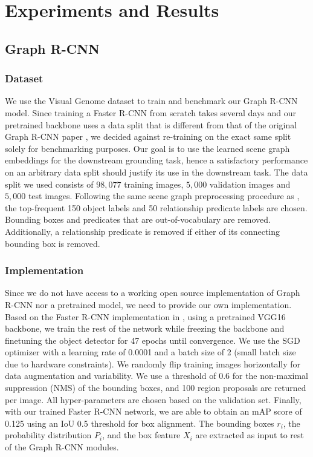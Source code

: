 \section{Experiments and Results}
\subsection{Graph R-CNN}
\subsubsection{Dataset}
We use the Visual Genome dataset \cite{krishna2017visual} to train and benchmark our Graph R-CNN model. Since training a Faster R-CNN from scratch takes several days and our pretrained backbone uses a data split that is different from that of the original Graph R-CNN paper \cite{yang2018graph}, we decided against re-training on the exact same split solely for benchmarking purposes. Our goal is to use the learned scene graph embeddings for the downstream grounding task, hence a satisfactory performance on an arbitrary data split should justify its use in the downstream task. The data split we used consists of $98,077$ training images, $5,000$ validation images and $5,000$ test images. Following the same scene graph preprocessing procedure as \cite{yang2018graph}, the top-frequent 150 object labels and 50 relationship predicate labels are chosen. Bounding boxes and predicates that are out-of-vocabulary are removed. Additionally, a relationship predicate is removed if either of its connecting bounding box is removed. 

\subsubsection{Implementation} 
Since we do not have access to a working open source implementation of Graph R-CNN nor a pretrained model, we need to provide our own implementation. Based on the Faster R-CNN implementation in \cite{jjfaster2rcnn}, using a pretrained VGG16\cite{simonyan2014very} backbone, we train the rest of the network while freezing the backbone and finetuning the object detector for 47 epochs until convergence. We use the SGD \cite{robbins1951stochastic} optimizer with a learning rate of 0.0001 and a batch size of 2 (small batch size due to hardware constraints). We randomly flip training images horizontally for data augmentation and variability. We use a threshold of 0.6 for  the non-maximal suppression (NMS) of the bounding boxes, and 100 region proposals are returned per image. All hyper-parameters are chosen based on the validation set. Finally, with our trained Faster R-CNN network, we are able to obtain an mAP score of 0.125 using an IoU 0.5 threshold for box alignment. The bounding boxes $r_i$, the probability distribution $P_i$, and the box feature $X_i$ are extracted as input to rest of the Graph R-CNN modules. 

